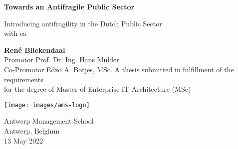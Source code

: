 \begin{titlepage}
	\begin{center}
		\vspace*{1cm}
		\Huge
		\textbf{Towards an Antifragile Public Sector}
		
		\vspace{0.9cm}
		\large
		
		Introducing \Gls{antifragility} in the Dutch Public Sector\\%
		with \gls{ea}
		
		\vspace{1.5cm}
		\Large
		\textbf{René Bliekendaal}\\
		\vspace{0.8cm}
		Promotor Prof. Dr. Ing. Hans Mulder\\
		Co-Promotor Edzo A. Botjes, MSc.		
		\vfill
		\large
		A thesis submitted in fulfillment of the requirements\\
		for the degree of Master of Enterprise IT Architecture (MSc)
		
		\vspace{0.8cm}
	
			\texttt{[image: images/ams-logo]}
		
		\vspace{0.8cm}
		
		\Large
		Antwerp Management School\\
		Antwerp, Belgium\\
		13 May 2022
	\end{center}
\end{titlepage}